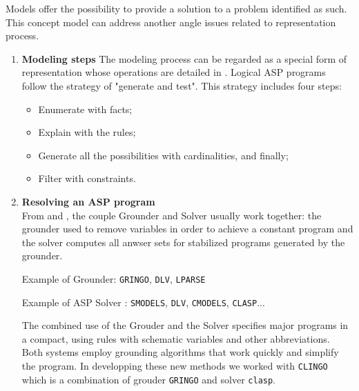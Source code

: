 Models offer the possibility to provide a solution to a problem identified as such. This concept model can address another angle issues related to representation process.

\begin{enumerate}
\item\textbf{ Modeling steps}
The modeling process can be regarded as a special form of representation whose operations are detailed in \cite{baral2003knowledge}. Logical ASP programs follow the strategy of "generate and test". This strategy includes four steps:

\begin{itemize}
\item Enumerate with facts;
\item Explain with the rules;
\item Generate all the possibilities with cardinalities, and finally;
\item Filter with constraints.
\end{itemize}

\item \textbf{ Resolving an ASP program} \\
From \cite{Vladimir} and \cite{AnsPrologAPE}, the couple Grounder and Solver usually work together: the grounder used to remove variables in order to achieve a constant program and the solver computes all anwser sets for stabilized programs generated by the grounder.

Example of Grounder: \texttt{GRINGO}, \texttt{DLV}, \texttt{LPARSE}

Example of ASP Solver : \texttt{SMODELS}, \texttt{DLV}, \texttt{CMODELS}, \texttt{CLASP}...


The combined use of the Grouder and the Solver specifies major programs in a compact, using rules with schematic variables and other abbreviations. Both systems employ grounding algorithms that work quickly and simplify the program. In developping these new methods we worked with \texttt{CLINGO} which is a combination of grouder \texttt{GRINGO} and solver \texttt{clasp}.

\end{enumerate}

